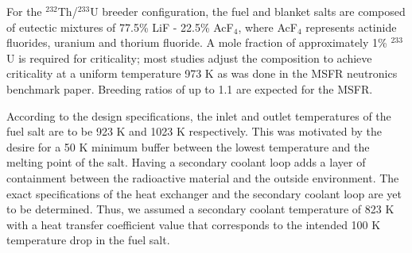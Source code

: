 For the $^{232}$Th/$^{233}$U breeder configuration, the fuel and blanket salts
are composed of eutectic mixtures of 77.5\% LiF - 22.5\% AcF$_4$, where
AcF$_4$ represents actinide fluorides, uranium and thorium fluoride. A mole
fraction of approximately 1\% $^{233}$U is required for criticality; most
studies adjust the composition to achieve criticality at a uniform temperature
973 K as was done in the \gls{MSFR} neutronics benchmark paper. Breeding
ratios of up to 1.1 are expected for the \gls{MSFR}.

According to the design specifications, the inlet and outlet temperatures of
the fuel salt are to be 923 K and 1023 K respectively. This was motivated by
the desire for a 50 K minimum buffer between the lowest temperature
and the melting point of the salt.
Having a secondary coolant loop adds a layer of containment between the
radioactive material and the outside environment. The exact specifications of
the heat exchanger and the secondary coolant loop are yet to be determined.
Thus, we assumed a secondary coolant temperature of 823 K with a heat transfer
coefficient value that corresponds to the intended 100 K temperature drop in
the fuel salt.
